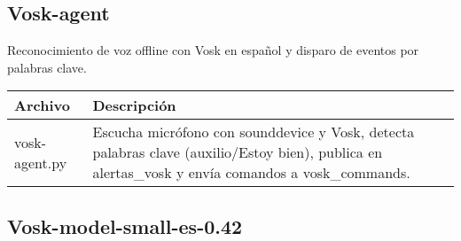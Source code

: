 \subsection*{Vosk-agent}

Reconocimiento de voz offline con Vosk en español y disparo de eventos por palabras clave.

\begin{table}[H]
  \doublespacing
  \begin{tabularx}{\textwidth}{l X}
    \hline
    \textbf{Archivo} & \textbf{Descripción} \\
    \hline
    vosk-agent.py    &
    Escucha micrófono con sounddevice y Vosk, detecta palabras clave (auxilio/Estoy bien), publica en alertas\_vosk y envía comandos a vosk\_commands.
    \\
    \hline
  \end{tabularx}
\end{table}

\subsection*{Vosk-model-small-es-0.42}

